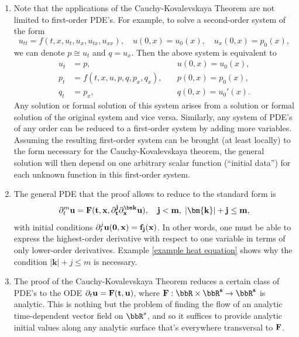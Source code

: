 \begin{rem}
    
\begin{enumerate}
    \item Note that the applications of the Cauchy-Kovalevskaya Theorem are not limited to first-order PDE's. For example, to solve a second-order system of the form 
    \[u_{tt}=f(t,x,u_t,u_x,u_{tx},u_{xx}),\quad u(0,x)=u_0(x),\quad u_x(0,x)=p_0(x),\]
    we can denote $p\cong u_t$ and $q=u_x$. Then the above system is equivalent to 
    \begin{align}
        u_t&=p,\quad &u(0,x)=u_0(x),\\
        p_t&=f(t,x,u,p,q,p_x,q_x),\quad & p(0,x)=p_0(x),\\
        q_t&=p_x,\quad &q(0,x)=u_0'(x).
    \end{align}
    Any solution or formal solution of this system arises from a solution or formal solution of the original system and vice versa. Similarly, any system of PDE's of any order can be reduced to a first-order system by adding more variables. Assuming the resulting first-order system can be brought (at least locally) to the form necessary for the Cauchy-Kovalevskaya theorem, the general solution will then depend on one arbitrary scalar function (``initial data'') for each unknown function in this first-order system. 

    \item The general PDE that the proof allows to reduce to the standard form is 
    \[\partial^{m}_t\bf{u}=\bf{F}(t,x,\partial^j_t\partial^{\bm k}_{\bf x}\bf{u}),\quad j<m,\; |\bm{k}|+j\leq m,\]
    with initial conditions $\partial^j_t\bf{u}(0,\bf{x})=\bf{f}_j(\bf{x})$. In other words, one must be able to express the highest-order derivative with respect to one variable in terms of only lower-order derivatives. Example \ref{example heat equation} shows why the condition $|\bm{k}|+j\leq m$ is necessary.

    \item The proof of the Cauchy-Kovalevskaya Theorem reduces a certain class of PDE's to the ODE $\partial_t\bf{u}=\bf{F}(t,\bf{u})$, where $\bf{F}:\bbR\times\bbR^s\to\bbR^s$ is analytic. This is nothing but the problem of finding the flow of an analytic time-dependent vector field on $\bbR^s$, and so it suffices to provide analytic initial values along any analytic surface that's everywhere transversal to $\bf{F}$.
\end{enumerate}
\end{rem}


